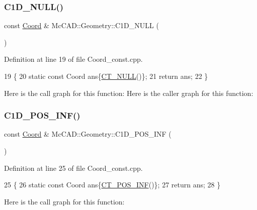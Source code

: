 \subsubsection{\texorpdfstring{C1\+D\+\_\+\+N\+U\+L\+L()}{C1D\_NULL()}}
{\footnotesize\ttfamily const \hyperlink{classMcCAD_1_1Geometry_1_1Coord}{Coord} \& Mc\+C\+A\+D\+::\+Geometry\+::\+C1\+D\+\_\+\+N\+U\+LL (\begin{DoxyParamCaption}{ }\end{DoxyParamCaption})}



Definition at line 19 of file Coord\+\_\+const.\+cpp.


\begin{DoxyCode}
19                        \{
20     \textcolor{keyword}{static} \textcolor{keyword}{const} Coord ans\{\hyperlink{namespaceMcCAD_1_1Geometry_a7a1a1f1e3e0547cde4d81dec1a126c28}{CT\_NULL}()\};
21     \textcolor{keywordflow}{return} ans;
22 \}
\end{DoxyCode}
Here is the call graph for this function\+:
Here is the caller graph for this function\+:
\mbox{\label{namespaceMcCAD_1_1Geometry_af4743431c44b10918e128421340b6364}} 
\subsubsection{\texorpdfstring{C1\+D\+\_\+\+P\+O\+S\+\_\+\+I\+N\+F()}{C1D\_POS\_INF()}}
{\footnotesize\ttfamily const \hyperlink{classMcCAD_1_1Geometry_1_1Coord}{Coord} \& Mc\+C\+A\+D\+::\+Geometry\+::\+C1\+D\+\_\+\+P\+O\+S\+\_\+\+I\+NF (\begin{DoxyParamCaption}{ }\end{DoxyParamCaption})}



Definition at line 25 of file Coord\+\_\+const.\+cpp.


\begin{DoxyCode}
25                           \{
26     \textcolor{keyword}{static} \textcolor{keyword}{const} Coord ans\{\hyperlink{namespaceMcCAD_1_1Geometry_a945de946c04dd593309595bc369b5163}{CT\_POS\_INF}()\};
27     \textcolor{keywordflow}{return} ans;
28 \}
\end{DoxyCode}
Here is the call graph for this function\+:
\mbox{\label{namespaceMcCAD_1_1Geometry_a1839f640b92275bf5245e918fa8a2137}} 
